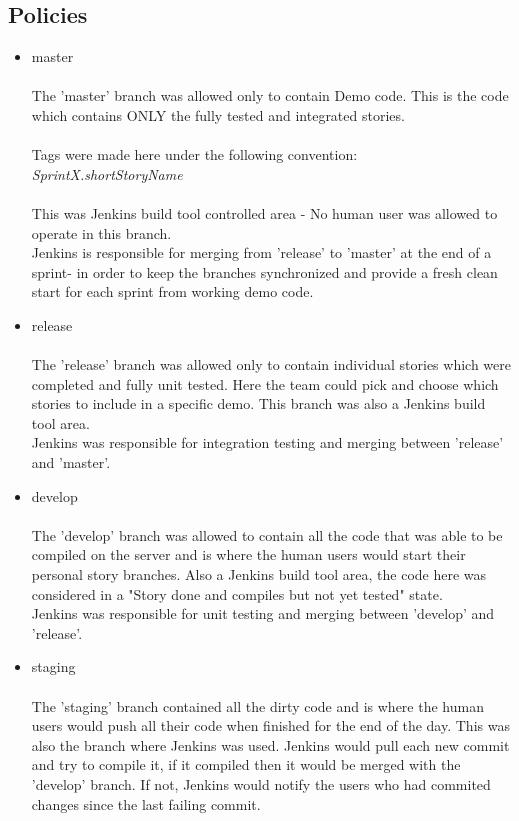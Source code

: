 \subsection {Policies}
\begin{itemize}
\item master\\ \\
The 'master' branch was allowed only to contain Demo code. This is the code which contains ONLY the fully tested and integrated stories.  \\\\Tags were made here under the following convention:\\ \emph{SprintX.shortStoryName} \\\\
This was Jenkins build tool controlled area - No human user was allowed to operate in this branch. \\Jenkins is responsible for merging from 'release' to 'master' at the end of a sprint- in order to keep the branches synchronized and provide a fresh clean start for each sprint from working demo code.\\
\item release\\ \\
The 'release' branch was allowed only to contain individual stories which were completed and fully unit tested. Here the team could pick and choose which stories to include in a specific demo. This branch was also a Jenkins build tool area. \\Jenkins was responsible for integration testing and merging between 'release' and 'master'.
\item develop\\ \\
The 'develop' branch was allowed to contain all the code that was able to be compiled on the server and is where the human users would start their personal story branches. Also a Jenkins build tool area, the code here was considered in a "Story done and compiles but not yet tested" state.\\ Jenkins was responsible for unit testing and merging between 'develop' and 'release'.

\item staging \\ \\
The 'staging' branch contained all the dirty code and is where the human users would push all their code when finished for the end of the day. This was also the branch where Jenkins was used. Jenkins would pull each new commit and try to compile it, if it compiled then it would be merged with the 'develop' branch. If not, Jenkins would notify the users who had commited changes since the last failing commit.


\end{itemize}
